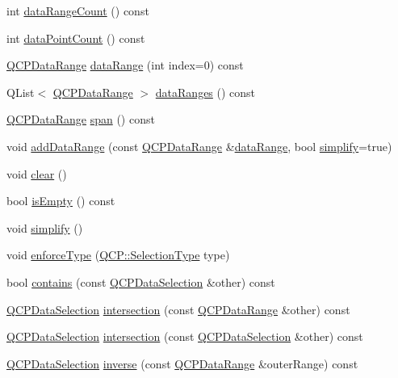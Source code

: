 \begin{DoxyCompactItemize}
\item 
int \hyperlink{classQCPDataSelection_abd8869ccb231ab991e8576de931f647d}{data\+Range\+Count} () const
\item 
int \hyperlink{classQCPDataSelection_ac9e74dd294778aa799216c3435c9c4f0}{data\+Point\+Count} () const
\item 
\hyperlink{classQCPDataRange}{Q\+C\+P\+Data\+Range} \hyperlink{classQCPDataSelection_a6956acf6a9a49a353b4f9b58608978ad}{data\+Range} (int index=0) const
\item 
Q\+List$<$ \hyperlink{classQCPDataRange}{Q\+C\+P\+Data\+Range} $>$ \hyperlink{classQCPDataSelection_ac3b1c5e7713d380cd9e447f4556b94da}{data\+Ranges} () const
\item 
\hyperlink{classQCPDataRange}{Q\+C\+P\+Data\+Range} \hyperlink{classQCPDataSelection_a890f9291e0b7f065747040de5d68ff7d}{span} () const
\item 
void \hyperlink{classQCPDataSelection_a46740c5aa7b80ae9b2abf6985d61b74f}{add\+Data\+Range} (const \hyperlink{classQCPDataRange}{Q\+C\+P\+Data\+Range} \&\hyperlink{classQCPDataSelection_a6956acf6a9a49a353b4f9b58608978ad}{data\+Range}, bool \hyperlink{classQCPDataSelection_a4a2fbad1a6e4d1dd26fdfdf88956f2a4}{simplify}=true)
\item 
void \hyperlink{classQCPDataSelection_a385dd665e6690d39afb8bbd727b1e00b}{clear} ()
\item 
bool \hyperlink{classQCPDataSelection_a7f7526b475998dc0c3d6c376b24736c9}{is\+Empty} () const
\item 
void \hyperlink{classQCPDataSelection_a4a2fbad1a6e4d1dd26fdfdf88956f2a4}{simplify} ()
\item 
void \hyperlink{classQCPDataSelection_a17b84d852911531d229f4a76aa239a75}{enforce\+Type} (\hyperlink{namespaceQCP_ac6cb9db26a564b27feda362a438db038}{Q\+C\+P\+::\+Selection\+Type} type)
\item 
bool \hyperlink{classQCPDataSelection_ab1ad3d5bbb55749c3f7ab1e45429c932}{contains} (const \hyperlink{classQCPDataSelection}{Q\+C\+P\+Data\+Selection} \&other) const
\item 
\hyperlink{classQCPDataSelection}{Q\+C\+P\+Data\+Selection} \hyperlink{classQCPDataSelection_af5267ced53687561367105ee77b874ab}{intersection} (const \hyperlink{classQCPDataRange}{Q\+C\+P\+Data\+Range} \&other) const
\item 
\hyperlink{classQCPDataSelection}{Q\+C\+P\+Data\+Selection} \hyperlink{classQCPDataSelection_af296ec5a948656c1d1ecb7b2970d2a24}{intersection} (const \hyperlink{classQCPDataSelection}{Q\+C\+P\+Data\+Selection} \&other) const
\item 
\hyperlink{classQCPDataSelection}{Q\+C\+P\+Data\+Selection} \hyperlink{classQCPDataSelection_ae8097f4e4ffee7b1b5df27c93eb365db}{inverse} (const \hyperlink{classQCPDataRange}{Q\+C\+P\+Data\+Range} \&outer\+Range) const
\end{DoxyCompactItemize}
